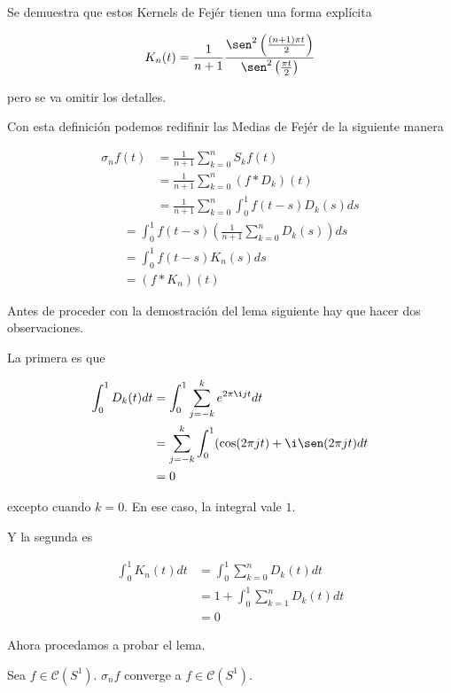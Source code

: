 Se demuestra que estos Kernels de Fejér tienen una forma explícita

\begin{equation}
	K_n(t) = \frac{1}{n+1} \frac{\sen^2 \left( \frac{(n+1)\pi t}{2} \right)}{\sen^2 \left( \frac{\pi t}{2} \right)}
\end{equation}

pero se va omitir los detalles.

Con esta definición podemos redifinir las Medias de Fejér de la siguiente manera

\begin{align}
	\sigma_n f(t) &= \frac{1}{n+1} \sum_{k=0}^{n} S_k f(t)\\
	&= \frac{1}{n+1} \sum_{k=0}^{n} (f * D_k)(t)\\
	&= \frac{1}{n+1} \sum_{k=0}^{n} \int_{0}^{1} f(t-s) D_k(s) ds
\end{align}
\begin{align}
	&= \int_{0}^{1} f(t-s) \left( \frac{1}{n+1} \sum_{k=0}^{n} D_k(s) \right) ds\\
	&= \int_{0}^{1} f(t-s) K_n(s) ds\\
	&= (f * K_n)(t)
\end{align}

Antes de proceder con la demostración del lema siguiente hay que hacer dos observaciones. 

La primera es que

\begin{align}
	\int_{0}^{1} D_k(t) dt &= \int_{0}^{1} \sum_{j=-k}^{k}  e^{2\pi \i jt} dt\\
	&= \sum_{j=-k}^{k} \int_{0}^{1} (\cos(2\pi jt) + \i \sen(2\pi jt) dt\\
	&= 0
\end{align}

excepto cuando $k=0$. En ese caso, la integral vale $1$. 

Y la segunda es

\begin{align}
	\int_{0}^{1} K_n(t) dt &= \int_{0}^{1} \sum_{k=0}^{n} D_k(t) dt\\
	&= 1+ \int_{0}^{1} \sum_{k=1}^{n} D_k(t) dt\\
	&= 0
\end{align}

Ahora procedamos a probar el lema.

\begin{lema}\label{sigmanf}
	Sea $f \in \mathcal{C}(S^1)$. $\sigma_n f$ converge a $f \in \mathcal{C}(S^1)$.
\end{lema}

